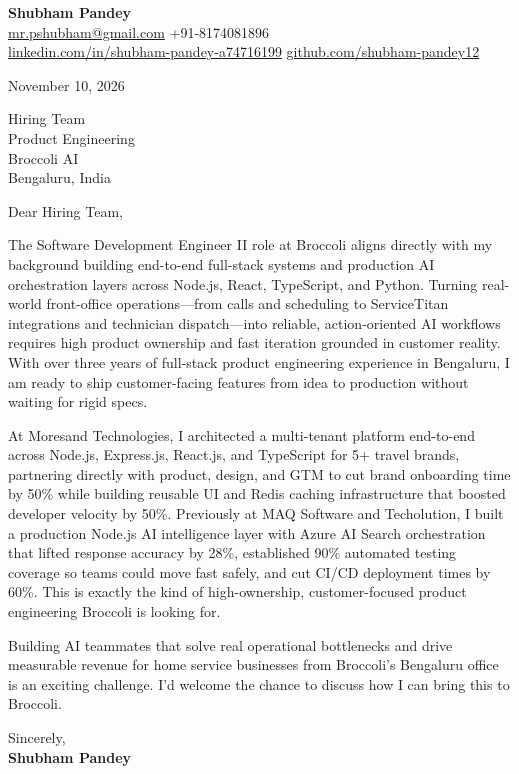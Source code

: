 \documentclass[a4paper,11pt]{article}
\begin{document}
\textbf{\Large Shubham Pandey}\\
\href{mailto:mr.pshubham@gmail.com}{mr.pshubham@gmail.com} \quad +91-8174081896\\
\href{https://www.linkedin.com/in/shubham-pandey-a74716199/}{linkedin.com/in/shubham-pandey-a74716199} \quad
\href{https://github.com/shubham-pandey12}{github.com/shubham-pandey12}

\vspace{1em}
November 10, 2026

\vspace{1em}
Hiring Team\\
Product Engineering\\
Broccoli AI\\
Bengaluru, India

\vspace{1em}
Dear Hiring Team,

The Software Development Engineer II role at Broccoli aligns directly with my background building end-to-end full-stack systems and production AI orchestration layers across Node.js, React, TypeScript, and Python. Turning real-world front-office operations---from calls and scheduling to ServiceTitan integrations and technician dispatch---into reliable, action-oriented AI workflows requires high product ownership and fast iteration grounded in customer reality. With over three years of full-stack product engineering experience in Bengaluru, I am ready to ship customer-facing features from idea to production without waiting for rigid specs.

At Moresand Technologies, I architected a multi-tenant platform end-to-end across Node.js, Express.js, React.js, and TypeScript for 5+ travel brands, partnering directly with product, design, and GTM to cut brand onboarding time by 50\% while building reusable UI and Redis caching infrastructure that boosted developer velocity by 50\%. Previously at MAQ Software and Techolution, I built a production Node.js AI intelligence layer with Azure AI Search orchestration that lifted response accuracy by 28\%, established 90\% automated testing coverage so teams could move fast safely, and cut CI/CD deployment times by 60\%. This is exactly the kind of high-ownership, customer-focused product engineering Broccoli is looking for.

Building AI teammates that solve real operational bottlenecks and drive measurable revenue for home service businesses from Broccoli's Bengaluru office is an exciting challenge. I'd welcome the chance to discuss how I can bring this to Broccoli.

\vspace{1em}
Sincerely,\\[0.5em]
\textbf{Shubham Pandey}
\end{document}
